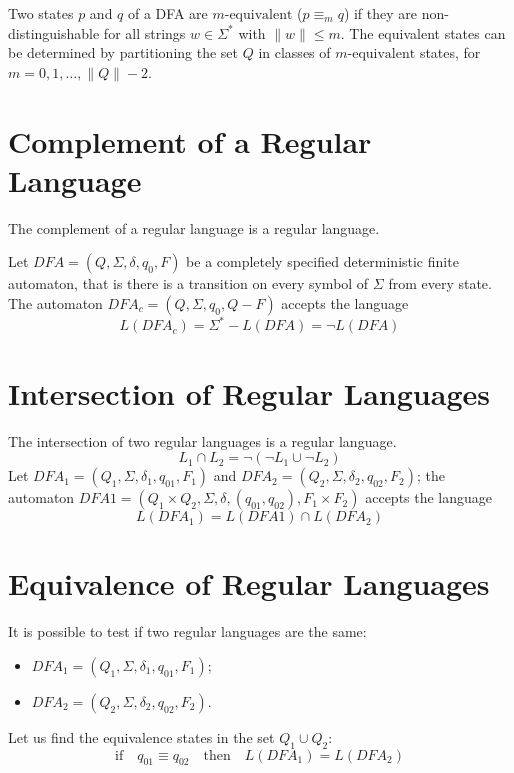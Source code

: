 Two states $p$ and $q$ of a DFA are $m\text{-equivalent}$ ($p \equiv_m q$) if they are non-distinguishable for all strings $w \in \Sigma^\ast$ with $\|w\| \leq m$.
The equivalent states can be determined by partitioning the set $Q$ in classes of $m\text{-equivalent}$ states, for $m = 0, 1, \ldots, \|Q\| - 2$.

\section{Complement of a Regular Language}
The complement of a regular language is a regular language.

Let $DFA = (Q, \Sigma, \delta, q_0, F)$ be a completely specified deterministic finite automaton, that is there is a transition on every symbol of $\Sigma$ from every state.
The automaton $DFA_c = (Q, \Sigma, q_0, Q - F)$ accepts the language
$$
	L(DFA_c) = \Sigma^\ast - L(DFA) = \neg L(DFA)
$$

\section{Intersection of Regular Languages}
The intersection of two regular languages is a regular language.
$$
	L_1 \cap L_2 = \neg (\neg L_1 \cup \neg L_2)
$$
Let $DFA_1 = (Q_1, \Sigma, \delta_1, q_{01}, F_1)$ and $DFA_2 = (Q_2, \Sigma, \delta_2, q_{02}, F_2)$; the automaton $DFA1 = (Q_1 \times Q_2, \Sigma, \delta, (q_{01}, q_{02}), F_1 \times F_2)$ accepts the language
$$
	L(DFA_1) = L(DFA1) \cap L(DFA_2)
$$

\section{Equivalence of Regular Languages}
It is possible to test if two regular languages are the same:
\begin{itemize}
	\item $DFA_1 = (Q_1, \Sigma, \delta_1, q_{01}, F_1)$;
	\item $DFA_2 = (Q_2, \Sigma, \delta_2, q_{02}, F_2)$.
\end{itemize}
Let us find the equivalence states in the set $Q_1 \cup Q_2$:
$$
	\text{if} \quad q_{01} \equiv q_{02} \quad \text{then} \quad L(DFA_1) = L(DFA_2)
$$